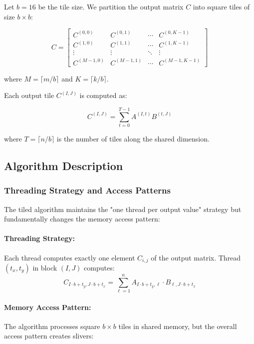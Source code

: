 \documentclass{amsbook}
\theoremstyle{definition}
\begin{document}
Let $b = 16$ be the tile size. We partition the output matrix $C$ into square tiles of size $b \times b$:

\begin{equation}
C = \begin{bmatrix}
C^{(0,0)} & C^{(0,1)} & \cdots & C^{(0,K-1)} \\
C^{(1,0)} & C^{(1,1)} & \cdots & C^{(1,K-1)} \\
\vdots & \vdots & \ddots & \vdots \\
C^{(M-1,0)} & C^{(M-1,1)} & \cdots & C^{(M-1,K-1)}
\end{bmatrix}
\end{equation}

where $M = \lceil m/b \rceil$ and $K = \lceil k/b \rceil$.

Each output tile $C^{(I,J)}$ is computed as:

\begin{equation}
C^{(I,J)} = \sum_{t=0}^{T-1} A^{(I,t)} B^{(t,J)}
\end{equation}

where $T = \lceil n/b \rceil$ is the number of tiles along the shared dimension.

\subsection{Algorithm Description}

\subsubsection{Threading Strategy and Access Patterns}

The tiled algorithm maintains the "one thread per output value" strategy but fundamentally changes the memory access pattern:

\paragraph{Threading Strategy:} Each thread computes exactly one element $C_{i,j}$ of the output matrix. Thread $(t_x, t_y)$ in block $(I, J)$ computes:
\begin{equation}
C_{I \cdot b + t_y, J \cdot b + t_x} = \sum_{\ell=1}^{n} A_{I \cdot b + t_y, \ell} \cdot B_{\ell, J \cdot b + t_x}
\end{equation}

\paragraph{Memory Access Pattern:} The algorithm processes square $b \times b$ tiles in shared memory, but the overall access pattern creates slivers:
\end{document}
